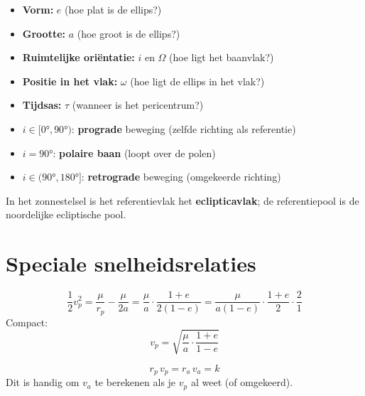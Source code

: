 \documentclass[11pt, a4paper]{article}
\begin{document}
\begin{weetje}
\begin{itemize}[leftmargin=1.5em, itemsep=2pt]
  \item \textbf{Vorm:} $e$ (hoe plat is de ellips?)
  \item \textbf{Grootte:} $a$ (hoe groot is de ellips?)
  \item \textbf{Ruimtelijke oriëntatie:} $i$ en $\Omega$ (hoe ligt het baanvlak?)
  \item \textbf{Positie in het vlak:} $\omega$ (hoe ligt de ellips in het vlak?)
  \item \textbf{Tijdsas:} $\tau$ (wanneer is het pericentrum?)
\end{itemize}
\end{weetje}

\begin{weetje}
\begin{itemize}[leftmargin=1.5em, itemsep=1pt]
  \item $i \in [0°, 90°)$: \textbf{prograde} beweging (zelfde richting als referentie)
  \item $i = 90°$: \textbf{polaire baan} (loopt over de polen)
  \item $i \in (90°, 180°]$: \textbf{retrograde} beweging (omgekeerde richting)
\end{itemize}
In het zonnestelsel is het referentievlak het \textbf{eclipticavlak}; de referentiepool is de noordelijke ecliptische pool.
\end{weetje}

\section{Speciale snelheidsrelaties}

\begin{formule}
\[
  \frac{1}{2}v_p^2 = \frac{\mu}{r_p} - \frac{\mu}{2a}
  = \frac{\mu}{a}\cdot\frac{1+e}{2(1-e)}
  = \frac{\mu}{a(1-e)}\cdot\frac{1+e}{2} \cdot \frac{2}{1}
\]
Compact:
\[
  v_p = \sqrt{\frac{\mu}{a}\cdot\frac{1+e}{1-e}}
\]
\end{formule}

\begin{formule}
\[
  r_p\,v_p = r_a\,v_a = k
\]
Dit is handig om $v_a$ te berekenen als je $v_p$ al weet (of omgekeerd).
\end{formule}
\end{document}
